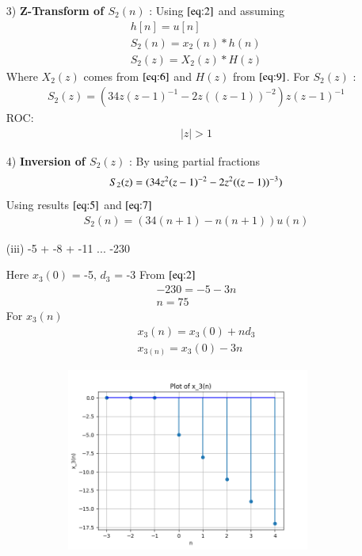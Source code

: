 \documentclass[journal,12pt,twocolumn]{IEEEtran}
\theoremstyle{remark}
\begin{document}
\begin{enumerate}
\item[3)]
\textbf{Z-Transform of $S_2(n)$} :
Using $\eqref{eq:2}$ and assuming 
\begin{align}
         h[n]=u[n] \\
    S_2(n) = x_2(n) * h(n) \\
    S_2(z) = X_2(z) * H(z)
    \end{align}
    Where $X_2(z)$ comes from $\eqref{eq:6}$ and $H(z)$ from $\eqref{eq:9}$.
    \vspace{0.05cm}
    For $S_2(z)$ :
    \begin{align}
            S_2(z) = (34z(z-1)^{-1}-
       2z((z-1))^{-2})z(z-1)^{-1}
    \end{align}
    ROC:
    \begin{align} 
    \lvert z \rvert > 1
    \end{align}
    
    \item[4)]
\textbf{Inversion of $S_2(z)$} :
By using partial fractions 
\begin{align}
    S_2(z) = \notag(34z^2(z-1)^{-2} - 2z^2((z-1))^{-3}) 
\end{align}
Using results $\eqref{eq:5}$ and $\eqref{eq:7}$
\begin{align}
 S_2(n) = (34(n+1) - n(n+1))u(n)   
\end{align}

\vspace{1cm}
 
\vspace{0.5cm}
\item[(iii)]
-5 + -8 + -11 ... -230\vspace{0.05cm}
\vspace{0.2cm}

Here $x_3(0)$ = -5, $d_3$ = -3\vspace{0.05cm}
From $\eqref{eq:2}$
\begin{align}
-230= -5 -3n \\
n=75
\end{align}
For $x_3(n)$
\begin{align}
x_3(n) = x_3(0) + nd_3\\
x_{3(n)}=x_3(0) - 3n
\end{align}

\begin{figure}[!ht]   
\centering
\graphicspath{ {figs/} }
\includegraphics[width=10cm, height=6cm]{graph_3}
\captionsetup{Graph:3 $x_3(n)$ vs n }
\label{graph:4}
\end{figure}


\end{enumerate}
\end{document}
